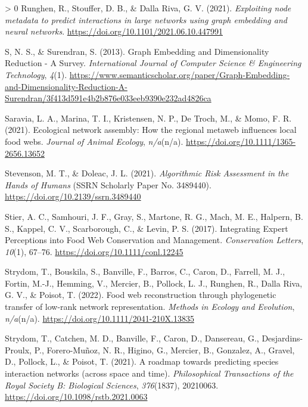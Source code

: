 \documentclass[11pt]{article}
\newlength{\cslhangindent}
\newenvironment{CSLReferences}[3] %
 {%
  \setlength{\parindent}{0pt}
  \ifodd #1 \everypar{\setlength{\hangindent}{\cslhangindent}}\ignorespaces\fi
  \ifnum #2 > 0
  \setlength{\parskip}{#2\baselineskip}
  \fi
 }%
 {}
\begin{document}
\begin{CSLReferences}{1}{0}
\leavevmode\hypertarget{ref-Runghen2021ExpNod}{}%
Runghen, R., Stouffer, D. B., \& Dalla Riva, G. V. (2021).
\emph{Exploiting node metadata to predict interactions in large networks
using graph embedding and neural networks}.
\url{https://doi.org/10.1101/2021.06.10.447991}

\leavevmode\hypertarget{ref-S2013GraEmb}{}%
S, N. S., \& Surendran, S. (2013). Graph Embedding and Dimensionality
Reduction - A Survey. \emph{International Journal of Computer Science \&
Engineering Technology}, \emph{4}(1).
\url{https://www.semanticscholar.org/paper/Graph-Embedding-and-Dimensionality-Reduction-A-Surendran/3f413d591e4b2b876e033eeb9390e232ad4826ca}

\leavevmode\hypertarget{ref-Saravia2021EcoNet}{}%
Saravia, L. A., Marina, T. I., Kristensen, N. P., De Troch, M., \& Momo,
F. R. (2021). Ecological network assembly: How the regional metaweb
influences local food webs. \emph{Journal of Animal Ecology},
\emph{n/a}(n/a). \url{https://doi.org/10.1111/1365-2656.13652}

\leavevmode\hypertarget{ref-Stevenson2021AlgRis}{}%
Stevenson, M. T., \& Doleac, J. L. (2021). \emph{Algorithmic Risk
Assessment in the Hands of Humans} (SSRN Scholarly Paper No. 3489440).
\url{https://doi.org/10.2139/ssrn.3489440}

\leavevmode\hypertarget{ref-Stier2017IntExp}{}%
Stier, A. C., Samhouri, J. F., Gray, S., Martone, R. G., Mach, M. E.,
Halpern, B. S., Kappel, C. V., Scarborough, C., \& Levin, P. S. (2017).
Integrating Expert Perceptions into Food Web Conservation and
Management. \emph{Conservation Letters}, \emph{10}(1), 67--76.
\url{https://doi.org/10.1111/conl.12245}

\leavevmode\hypertarget{ref-Strydom2022FooWeb}{}%
Strydom, T., Bouskila, S., Banville, F., Barros, C., Caron, D., Farrell,
M. J., Fortin, M.-J., Hemming, V., Mercier, B., Pollock, L. J., Runghen,
R., Dalla Riva, G. V., \& Poisot, T. (2022). Food web reconstruction
through phylogenetic transfer of low-rank network representation.
\emph{Methods in Ecology and Evolution}, \emph{n/a}(n/a).
\url{https://doi.org/10.1111/2041-210X.13835}

\leavevmode\hypertarget{ref-Strydom2021RoaPre}{}%
Strydom, T., Catchen, M. D., Banville, F., Caron, D., Dansereau, G.,
Desjardins-Proulx, P., Forero-Muñoz, N. R., Higino, G., Mercier, B.,
Gonzalez, A., Gravel, D., Pollock, L., \& Poisot, T. (2021). A roadmap
towards predicting species interaction networks (across space and time).
\emph{Philosophical Transactions of the Royal Society B: Biological
Sciences}, \emph{376}(1837), 20210063.
\url{https://doi.org/10.1098/rstb.2021.0063}


\end{CSLReferences}
\end{document}
